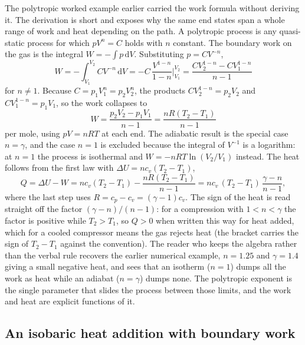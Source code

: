 The polytropic worked example earlier carried the work formula without
deriving it. The derivation is short and exposes why the same end states
span a whole range of work and heat depending on the path. A polytropic
process is any quasi-static process for which $pV^n = C$ holds with $n$
constant. The boundary work on the gas is the integral $W = -\int p\,
\mathrm{d}V$. Substituting $p = C V^{-n}$,
\[
W = -\int_{V_1}^{V_2} C V^{-n}\,\mathrm{d}V
  = -C\,\frac{V^{1-n}}{1-n}\bigg|_{V_1}^{V_2}
  = \frac{C V_2^{1-n} - C V_1^{1-n}}{n-1}
\]
for $n \neq 1$. Because $C = p_1 V_1^n = p_2 V_2^n$, the products
$C V_2^{1-n} = p_2 V_2$ and $C V_1^{1-n} = p_1 V_1$, so the work
collapses to
\[
W = \frac{p_2 V_2 - p_1 V_1}{n-1} = \frac{nR(T_2 - T_1)}{n-1}
\]
per mole, using $pV = nRT$ at each end. The adiabatic result is the
special case $n = \gamma$, and the case $n = 1$ is excluded because the
integral of $V^{-1}$ is a logarithm: at $n = 1$ the process is
isothermal and $W = -nRT\ln(V_2/V_1)$ instead. The heat follows from the
first law with $\Delta U = n c_v (T_2 - T_1)$,
\[
Q = \Delta U - W = n c_v(T_2 - T_1) - \frac{nR(T_2 - T_1)}{n-1}
  = n c_v\,(T_2 - T_1)\,\frac{\gamma - n}{n-1},
\]
where the last step uses $R = c_p - c_v = (\gamma - 1)c_v$. The sign of
the heat is read straight off the factor $(\gamma - n)/(n-1)$: for a
compression with $1 < n < \gamma$ the factor is positive while
$T_2 > T_1$, so $Q > 0$ when written this way for heat added, which for
a cooled compressor means the gas rejects heat (the bracket carries the
sign of $T_2 - T_1$ against the convention). The reader who keeps the
algebra rather than the verbal rule recovers the earlier numerical
example, $n = 1.25$ and $\gamma = 1.4$ giving a small negative heat, and
sees that an isotherm ($n = 1$) dumps all the work as heat while an
adiabat ($n = \gamma$) dumps none. The polytropic exponent is the single
parameter that slides the process between those limits, and the work and
heat are explicit functions of it.

\subsection{An isobaric heat addition with boundary work}

